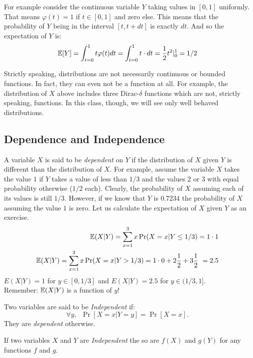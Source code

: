 \documentclass{article}
\begin{document}
For example consider the continuous variable $Y$ taking values in
$[0,1]$ uniformly. That means $\varphi(t) = 1$ if $t \in [0,1]$ and zero else.
This means that the probability of $Y$ being in the interval $[t,t + dt]$ is exactly $dt$. And so the expectation of $Y$ is:
\begin{equation}
{\mathbb E}[Y] = \int_{t=0}^{1}t \varphi(t) dt = \int_{t=0}^{1}t \cdot dt = \frac{1}{2}t^2|_{0}^{1} = 1/2
\end{equation}

\begin{remark}
Strictly speaking, distributions are not necessarily continuous or bounded functions. 
In fact, they can even not be a function at all. 
For example, the distribution of $X$ above includes three Dirac-$\delta$ functions which are not, strictly speaking, functions.
In this class, though, we will see only well behaved distributions.
\end{remark}


\subsection{Dependence and Independence}
A variable $X$ is said to be {\it dependent} on $Y$ if the distribution of $X$ given $Y$ is different than the distribution of $X$. 
For example, assume the variable $X$ takes the value $1$ if $Y$ takes a
value of less than $1/3$ and the values $2$ or $3$ with equal probability otherwise ($1/2$ each).
%
Clearly, the probability of $X$ assuming each of its values is still
$1/3$. However, if we know that $Y$ is $0.7234$ the probability of
$X$ assuming the value $1$ is zero. Let us calculate the expectation of $X$ given $Y$ as an exercise.
\begin{eqnarray}
\E(X | Y) = \sum_{x=1}^{3} x \Pr(X = x | Y \le 1/3) = 1\cdot 1\\
\E(X | Y) = \sum_{x=1}^{3} x \Pr(X = x | Y > 1/3) = 1\cdot 0 + 2
\frac{1}{2} + 3\frac{1}{2}  = 2.5
\end{eqnarray}
$E(X | Y) = 1$ for $y \in [0,1/3]$ and $E(X | Y) = 2.5$ for $y \in (1/3,1]$.\\
Remember: ${\mathbb E}(X | Y)$ is a function of $y$!

\begin{definition}[Independence]
Two variables are said to be {\it Independent} if:
\[
\forall y,\;\;\Pr[ X=x | Y = y] = \Pr[X=x].
\]
They are {\it dependent} otherwise.
\end{definition}


\begin{fact}
If two variables $X$ and $Y$ are {\it Independent} the so are $f(X)$ and $g(Y)$ for any functions $f$ and $g$.
\end{fact}
\end{document}
